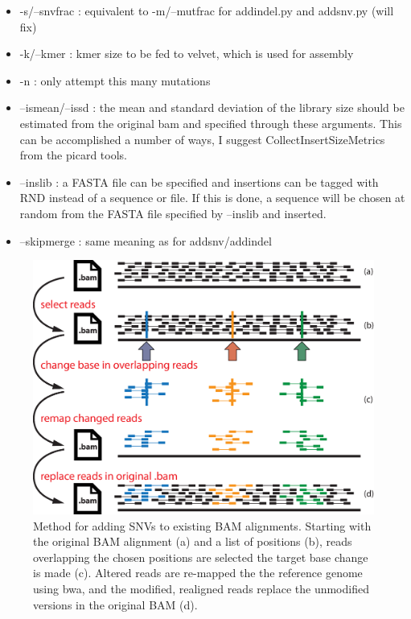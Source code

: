 \documentclass[letterpaper,11pt]{article}
\begin{document}
\begin{itemize}
\item -s/--snvfrac : equivalent to -m/--mutfrac for addindel.py and addsnv.py (will fix)
\item -k/--kmer : kmer size to be fed to velvet, which is used for assembly
\item -n : only attempt this many mutations
\item --ismean/--issd : the mean and standard deviation of the library size should be estimated from the original bam and specified through these arguments. This can be accomplished a number of ways, I suggest CollectInsertSizeMetrics from the picard tools.
\item --inslib : a FASTA file can be specified and insertions can be tagged with RND instead of a sequence or file. If this is done, a sequence will be chosen at random from the FASTA file specified by --inslib and inserted.
\item --skipmerge : same meaning as for addsnv/addindel
\end{itemize}

\newpage %
\begin{figure}[!h]
\centering
\includegraphics[width=5.5in]{bamsurgeon_snv.eps}
\caption{Method for adding SNVs to existing BAM alignments. Starting with the original BAM alignment (a) and a list of positions (b), reads overlapping the chosen positions are selected the target base change is made (c). Altered reads are re-mapped the the reference genome using bwa, and the modified, realigned reads replace the unmodified versions in the original BAM (d).}
\end{figure}
\end{document}
